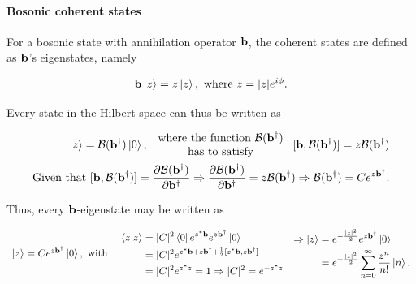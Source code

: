 \paragraph{\textbf{Bosonic coherent states}}

For a bosonic state with annihilation operator ${\bf b}$, the coherent states are defined as ${\bf b}$'s eigenstates, namely 

$$
    {\bf b} \ket{z} = z \ket{z}, \textnormal{ where } z = |z| e^{i\phi}.
$$

Every state in the Hilbert space can thus be written as 

\begin{align*}
    \ket{z} = \mathcal{B}({\bf b}^\dagger) \ket{0}, \begin{array}{c}
     \textnormal{ where the function $\mathcal{B}({\bf b}^\dagger)$ }\\
     \textnormal{  has to satisfy }
\end{array} [{\bf b},  \mathcal{B}({\bf b}^\dagger)] = z \mathcal{B}({\bf b}^\dagger) \\
\textnormal{Given that } [{\bf b}, \mathcal{B}({\bf b}^\dagger)] = \frac{\partial \mathcal{B}({\bf b}^\dagger)}{\partial {\bf b}^\dagger} \Rightarrow \frac{\partial \mathcal{B}({\bf b}^\dagger)}{\partial {\bf b}^\dagger}  = z \mathcal{B}({\bf b}^\dagger) \Rightarrow \mathcal{B}({\bf b}^\dagger) = C e^{z {\bf b}^\dagger}.
\end{align*}

Thus, every ${\bf b}$-eigenstate may be written as

\begin{equation*}   
\begin{array}{ccc}
     \ket{z} = C e^{z {\bf b}^\dagger} \ket{0}, \textnormal{ with } & 
     \begin{split}
     \bra{z}\ket{z} &= |C|^2 \bra{0} e^{z^* {\bf b}} e^{z {\bf b}^\dagger} \ket{0} \\
     &= |C|^2 e^{z^* {\bf b} + z {\bf b}^\dagger + \frac{1}{2} [z^* {\bf b}, z {\bf b}^\dagger]} \\
     &= |C|^2 e^{z^*z} = 1 \Rightarrow |C|^2 = e^{-z^*z} 
     \end{split} 
     &  \begin{split} \Rightarrow \ket{z} &= e^{-\frac{|z|^2}{2}} e^{z {\bf b}^\dagger} \ket{0}  \\
         &= e^{-\frac{|z|^2}{2}} \sum_{n=0}^{\infty} \frac{z^n}{n!} \ket{n}.
     \end{split}
     \end{array}
\end{equation*}


